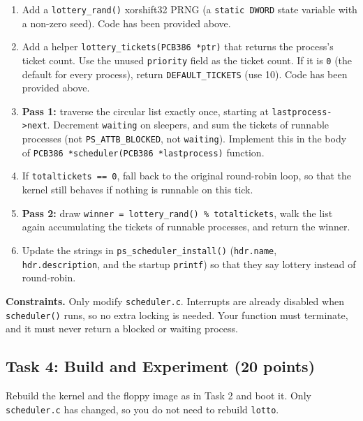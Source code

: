 \documentclass[a4paper, 11pt,oneside]{article}
\begin{document}
\begin{enumerate}[itemsep=0pt,parsep=0pt]
  \item Add a \texttt{lottery\_rand()} xorshift32 PRNG (a \texttt{static DWORD} state variable with a non-zero seed). Code has been provided above.
  \item Add a helper \texttt{lottery\_tickets(PCB386 *ptr)} that returns the process's ticket count. Use the unused \texttt{priority} field as the ticket count. If it is \texttt{0} (the default for every process), return \texttt{DEFAULT\_TICKETS} (use 10). Code has been provided above.
  \item \textbf{Pass 1:} traverse the circular list exactly once, starting at \texttt{lastprocess->next}. Decrement \texttt{waiting} on sleepers, and sum the tickets of runnable processes (not \texttt{PS\_ATTB\_BLOCKED}, not \texttt{waiting}). Implement this in the body of \texttt{PCB386 *scheduler(PCB386 *lastprocess)} function.
  \item If \texttt{totaltickets == 0}, fall back to the original round-robin loop, so that the kernel still behaves if nothing is runnable on this tick.
  \item \textbf{Pass 2:} draw \texttt{winner = lottery\_rand() \% totaltickets}, walk the list again accumulating the tickets of runnable processes, and return the winner.
  \item Update the strings in \texttt{ps\_scheduler\_install()} (\texttt{hdr.name}, \texttt{hdr.description}, and the startup \texttt{printf}) so that they say lottery instead of round-robin.
\end{enumerate}

\noindent\textbf{Constraints.} Only modify \texttt{scheduler.c}. Interrupts are already disabled when \texttt{scheduler()} runs, so no extra locking is needed. Your function must terminate, and it must never return a blocked or waiting process.

\subsection*{Task 4: Build and Experiment (20 points)}
Rebuild the kernel and the floppy image as in Task 2 and boot it. Only \texttt{scheduler.c} has changed, so you do not need to rebuild \texttt{lotto}.
\end{document}
